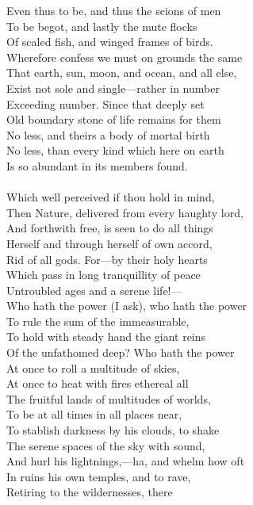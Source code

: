 Even thus to be, and thus the scions of men\\
To be begot, and lastly the mute flocks\\
Of scaled fish, and winged frames of birds.\\
Wherefore confess we must on grounds the same\\
That earth, sun, moon, and ocean, and all else,\\
Exist not sole and single—rather in number\\
Exceeding number. Since that deeply set\\
Old boundary stone of life remains for them\\
No less, and theirs a body of mortal birth\\
No less, than every kind which here on earth\\
Is so abundant in its members found.\\
\\
Which well perceived if thou hold in mind,\\
Then Nature, delivered from every haughty lord,\\
And forthwith free, is seen to do all things\\
Herself and through herself of own accord,\\
Rid of all gods. For—by their holy hearts\\
Which pass in long tranquillity of peace\\
Untroubled ages and a serene life!—\\
Who hath the power (I ask), who hath the power\\
To rule the sum of the immeasurable,\\
To hold with steady hand the giant reins\\
Of the unfathomed deep? Who hath the power\\
At once to roll a multitude of skies,\\
At once to heat with fires ethereal all\\
The fruitful lands of multitudes of worlds,\\
To be at all times in all places near,\\
To stablish darkness by his clouds, to shake\\
The serene spaces of the sky with sound,\\
And hurl his lightnings,—ha, and whelm how oft\\
In ruins his own temples, and to rave,\\
Retiring to the wildernesses, there\\
